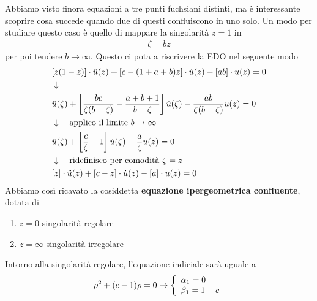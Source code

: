 Abbiamo visto finora equazioni a tre punti fuchsiani distinti, ma è interessante scoprire cosa succede quando due di questi confluiscono in uno solo. Un modo per studiare questo caso è quello di mappare la singolarità $z=1$ in
\begin{align}
	\zeta = bz
\end{align}
per poi tendere $b\to \infty$. Questo ci pota a riscrivere la EDO nel seguente modo
\begin{align}
	&[z(1-z)]\cdot \ddot{u}(z)  + [c-(1+a+b)z] \cdot \dot{u}(z) - [ab]\cdot u(z) = 0 \\ &\downarrow \nonumber \\
	&\ddot{u}(\zeta) + \left[ \frac{bc}{\zeta(b-\zeta)} - \frac{a+b+1}{b-\zeta} \right]\dot{u}(\zeta) - \frac{ab}{\zeta (b-\zeta)} u(z) = 0 \nonumber \\ &\downarrow \quad \text{applico il limite $b\to \infty$} \nonumber \\
	&\ddot{u}(\zeta) + \left[ \frac{c}{\zeta} - 1\right]\dot{u}(\zeta) - \frac{a}{\zeta } u(z) = 0 \nonumber \\ &\downarrow \quad \text{ridefinisco per comodità $\zeta=z$} \nonumber \\
	&[z]\cdot \ddot{u}(z)  + [c-z] \cdot \dot{u}(z) - [a]\cdot u(z) = 0 
\end{align}
Abbiamo così ricavato la cosiddetta \textbf{equazione ipergeometrica confluente}, dotata di
\begin{enumerate}
	\item $z=0$ singolarità regolare
	\item $z=\infty$ singolarità irregolare
\end{enumerate}

Intorno alla singolarità regolare, l'equazione indiciale sarà uguale a
\begin{align}
	\rho^2 + (c-1)\rho = 0 \to \double{\alpha_1 = 0\hfill}{\beta_1 = 1-c}
\end{align}

